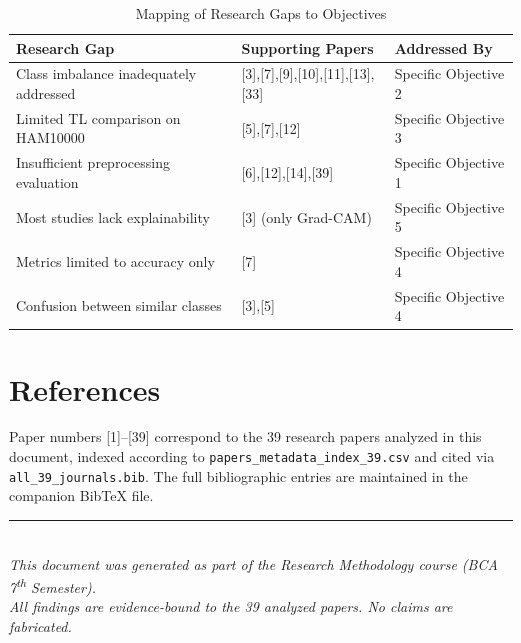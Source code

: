 \documentclass[11pt,a4paper]{article}
\begin{document}
\begin{table}[H]
\centering
\caption{Mapping of Research Gaps to Objectives}\label{tab:gapmap}
\renewcommand{\arraystretch}{1.3}
\begin{tabularx}{\textwidth}{L{5cm} L{3cm} X}
\toprule
\textbf{Research Gap} & \textbf{Supporting Papers} & \textbf{Addressed By} \\
\midrule
Class imbalance inadequately addressed & [3],[7],[9],[10],[11],[13],[33] & Specific Objective 2 \\
\midrule
Limited TL comparison on HAM10000 & [5],[7],[12] & Specific Objective 3 \\
\midrule
Insufficient preprocessing evaluation & [6],[12],[14],[39] & Specific Objective 1 \\
\midrule
Most studies lack explainability & [3] (only Grad-CAM) & Specific Objective 5 \\
\midrule
Metrics limited to accuracy only & [7] & Specific Objective 4 \\
\midrule
Confusion between similar classes & [3],[5] & Specific Objective 4 \\
\bottomrule
\end{tabularx}
\end{table}

\newpage

\section*{References}

Paper numbers [1]--[39] correspond to the 39 research papers analyzed in this document, indexed according to \texttt{papers\_metadata\_index\_39.csv} and cited via \texttt{all\_39\_journals.bib}. The full bibliographic entries are maintained in the companion BibTeX file.

\vfill
\begin{center}
\textcolor{navyblue}{\rule{0.6\textwidth}{0.5pt}}\\[0.3cm]
{\small\textit{This document was generated as part of the Research Methodology course (BCA 7\textsuperscript{th} Semester).}}\\
{\small\textit{All findings are evidence-bound to the 39 analyzed papers. No claims are fabricated.}}
\end{center}
\end{document}
